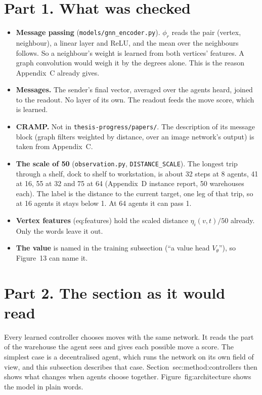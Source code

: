 \documentclass[11pt,a4paper]{article}
\newcommand{\lab}[1]{\textsf{\footnotesize #1}}
\renewcommand{\ref}[1]{\lab{#1}}
\renewcommand{\eqref}[1]{(\lab{#1})}
\begin{document}
\section*{Part 1. What was checked}
\begin{itemize}[nosep]
  \item \textbf{Message passing} (\texttt{models/gnn\_encoder.py}). $\phi_r$
    reads the pair (vertex, neighbour), a linear layer and ReLU, and the
    mean over the neighbours follows. So a neighbour's weight is learned
    from both vertices' features. A graph convolution would weigh it by the
    degrees alone. This is the reason Appendix~C already gives.
  \item \textbf{Messages.} The sender's final vector, averaged over the
    agents heard, joined to the readout. No layer of its own. The
    readout feeds the move score, which is learned.
  \item \textbf{CRAMP.} Not in \texttt{thesis-progress/papers/}. The
    description of its message block (graph filters weighted by distance,
    over an image network's output) is taken from Appendix~C.
  \item \textbf{The scale of 50} (\texttt{observation.py},
    \texttt{DISTANCE\_SCALE}). The longest trip through a shelf, dock to
    shelf to workstation, is about 32 steps at 8 agents, 41 at 16, 55 at 32
    and 75 at 64 (Appendix~D instance report, 50 warehouses each). The
    label is the distance to the current target, one leg of that trip, so
    at 16 agents it stays below 1. At 64 agents it can pass 1.
  \item \textbf{Vertex features} \eqref{eq:features} hold the scaled
    distance $\eta_i(v,t)/50$ already. Only the words leave it out.
  \item \textbf{The value} is named in the training subsection (``a value
    head $V_\theta$''), so Figure~13 can name it.
\end{itemize}

\section*{Part 2. The section as it would read}

Every learned controller chooses moves with the same network. It reads the
part of the warehouse the agent sees and gives each possible move a score.
The simplest case is a decentralised agent, which runs the network on its
own field of view, and this subsection describes that case.
Section~\ref{sec:method:controllers} then shows what changes when agents
choose together. Figure~\ref{fig:architecture} shows the model in plain words.
\end{document}
